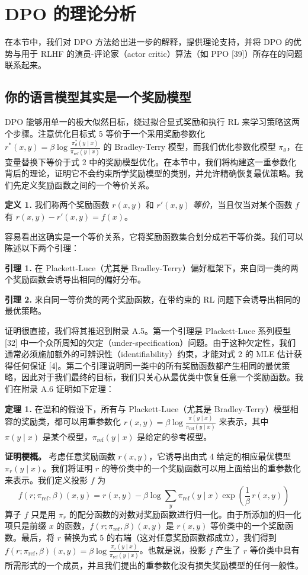 \documentclass[11pt,UTF8,fontset=fandol]{ctexart}
\newcommand{\sref}{\mathrm{ref}}
\begin{document}
\section{DPO 的理论分析}

在本节中，我们对 DPO 方法给出进一步的解释，提供理论支持，并将 DPO 的优势与用于 RLHF 的演员-评论家（actor critic）算法（如 PPO [39]）所存在的问题联系起来。

\subsection{你的语言模型其实是一个奖励模型}

DPO 能够用单一的极大似然目标，绕过拟合显式奖励和执行 RL 来学习策略这两个步骤。注意优化目标式 5 等价于一个采用奖励参数化 $r^*(x, y) = \beta \log \frac{\pi_\theta^*(y \mid x)}{\pi_\sref(y \mid x)}$ 的 Bradley-Terry 模型，而我们优化参数化模型 $\pi_\theta$，在变量替换下等价于式 2 中的奖励模型优化。在本节中，我们将构建这一重参数化背后的理论，证明它不会约束所学奖励模型的类别，并允许精确恢复最优策略。我们先定义奖励函数之间的一个等价关系。

\textbf{定义 1.} 我们称两个奖励函数 $r(x, y)$ 和 $r'(x, y)$ \emph{等价}，当且仅当对某个函数 $f$ 有 $r(x, y) - r'(x, y) = f(x)$。

容易看出这确实是一个等价关系，它将奖励函数集合划分成若干等价类。我们可以陈述以下两个引理：

\textbf{引理 1.} 在 Plackett-Luce（尤其是 Bradley-Terry）偏好框架下，来自同一类的两个奖励函数会诱导出相同的偏好分布。

\textbf{引理 2.} 来自同一等价类的两个奖励函数，在带约束的 RL 问题下会诱导出相同的最优策略。

证明很直接，我们将其推迟到附录 A.5。第一个引理是 Plackett-Luce 系列模型 [32] 中一个众所周知的欠定（under-specification）问题。由于这种欠定性，我们通常必须施加额外的可辨识性（identifiability）约束，才能对式 2 的 MLE 估计获得任何保证 [4]。第二个引理说明同一类中的所有奖励函数都产生相同的最优策略，因此对于我们最终的目标，我们只关心从最优类中恢复任意一个奖励函数。我们在附录 A.6 证明如下定理：

\textbf{定理 1.} 在温和的假设下，所有与 Plackett-Luce（尤其是 Bradley-Terry）模型相容的奖励类，都可以用重参数化 $r(x, y) = \beta \log \frac{\pi(y \mid x)}{\pi_\sref(y \mid x)}$ 来表示，其中 $\pi(y \mid x)$ 是某个模型，$\pi_\sref(y \mid x)$ 是给定的参考模型。

\textbf{证明梗概。} 考虑任意奖励函数 $r(x, y)$，它诱导出由式 4 给定的相应最优模型 $\pi_r(y \mid x)$。我们将证明 $r$ 的等价类中的一个奖励函数可以用上面给出的重参数化来表示。我们定义投影 $f$ 为
\begin{equation}
f(r; \pi_\sref, \beta)(x, y) = r(x, y) - \beta \log \sum_y \pi_\sref(y \mid x) \exp\left(\frac{1}{\beta}\, r(x, y)\right) \tag{8}
\end{equation}
算子 $f$ 只是用 $\pi_r$ 的配分函数的对数对奖励函数进行归一化。由于所添加的归一化项只是前缀 $x$ 的函数，$f(r; \pi_\sref, \beta)(x, y)$ 是 $r(x, y)$ 等价类中的一个奖励函数。最后，将 $r$ 替换为式 5 的右端（这对任意奖励函数都成立），我们得到 $f(r; \pi_\sref, \beta)(x, y) = \beta \log \frac{\pi_r(y \mid x)}{\pi_\sref(y \mid x)}$。也就是说，投影 $f$ 产生了 $r$ 等价类中具有所需形式的一个成员，并且我们提出的重参数化没有损失奖励模型的任何一般性。
\end{document}
